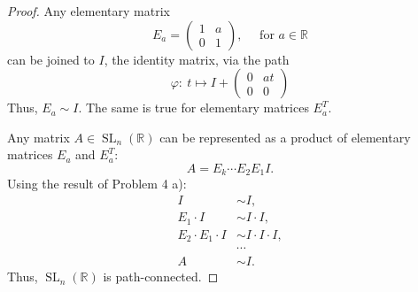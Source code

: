 \documentclass{article}
\theoremstyle{definition}
\newcommand{\R}{\mathbb{R}}
\newcommand{\SL}{\operatorname{SL}}
\newcommand{\SLnR}{\SL_n(\R)}
\begin{document}
\begin{proof}

Any elementary matrix
\[
    E_a = \begin{pmatrix}
        1 & a \\
        0 & 1
    \end{pmatrix},
    \quad \text{ for $a \in \R$}
\]
can be joined to $I$, the identity matrix, via the path
\[
    \varphi : \> 
    t \longmapsto
    I + \begin{pmatrix}
    0 & at \\
    0 & 0
    \end{pmatrix}
\]
Thus, $E_a \sim I$. The same is true for elementary matrices $E_a^T$.

Any matrix $A \in \SLnR$ can be represented as a product of elementary matrices $E_a$ and $E_a^T$:
\[ A = E_k \cdots E_2 E_1 I. \]
Using the result of Problem 4 a):
\begin{align*}
    I & \sim I, \\
    E_1 \cdot I & \sim I \cdot I, \\
    E_2 \cdot E_1 \cdot I & \sim I \cdot I \cdot I, \\
    & \cdots \\
    A & \sim I.
\end{align*}
Thus, $\SLnR$ is path-connected.

\end{proof}
\end{document}
